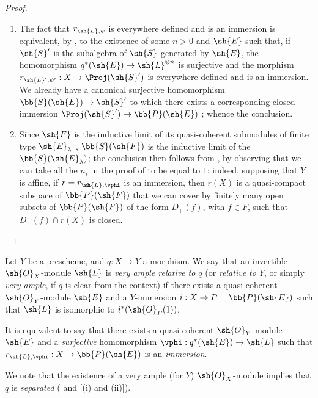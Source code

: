 \begin{proof}
\medskip\noindent
\begin{enumerate}
  \item[\rm{(i)}] The fact that $r_{\sh{L},\psi}$ is everywhere defined and is an immersion is equivalent, by , to the existence of some $n>0$ and $\sh{E}$ such that, if $\sh{S}'$ is the subalgebra of $\sh{S}$ generated by $\sh{E}$, the homomorphism $q^*(\sh{E})\to\sh{L}^{\otimes n}$ is surjective and the morphism $r_{\sh{L}',\psi'}:X\to\Proj(\sh{S}')$ is everywhere defined and is an immersion.
    We already have a canonical surjective homomorphism $\bb{S}(\sh{E})\to\sh{S}'$ to which there exists a corresponding closed immersion $\Proj(\sh{S}')\to\bb{P}(\sh{E})$ ;
    whence the conclusion.
  \item[\rm{(ii)}] Since $\sh{F}$ is the inductive limit of its quasi-coherent submodules of finite type $\sh{E}_\lambda$ , $\bb{S}(\sh{F})$ is the inductive limit of the $\bb{S}(\sh{E}_\lambda)$;
    the conclusion then follows from , by observing that we can take all the $n_i$ in the proof of  to be equal to $1$:
    indeed, supposing that $Y$ is affine, if $r=r_{\sh{L},\vphi}$ is an immersion, then $r(X)$ is a quasi-compact subspace of $\bb{P}(\sh{F})$ that we can cover by finitely many open subsets of $\bb{P}(\sh{F})$ of the form $D_+(f)$, with $f\in F$, such that $D_+(f)\cap r(X)$ is closed.
\end{enumerate}
\end{proof}

\begin{definition}[4.4.2]
\label{II.4.4.2}
Let $Y$ be a prescheme, and $q:X\to Y$ a morphism.
We say that an invertible $\sh{O}_X$-module $\sh{L}$ is \emph{very ample relative to $q$} (or \emph{relative to $Y$}, or simply \emph{very ample}, if $q$ is clear from the context) if there exists a quasi-coherent $\sh{O}_Y$-module $\sh{E}$ and a $Y$-immersion $i:X\to P=\bb{P}(\sh{E})$ such that $\sh{L}$ is isomorphic to $i^*(\sh{O}_P(1))$.
\end{definition}

It is equivalent  to say that there exists a quasi-coherent $\sh{O}_Y$-module $\sh{E}$ and a \emph{surjective} homomorphism $\vphi:q^*(\sh{E})\to\sh{L}$ such that $r_{\sh{L},\vphi}:X\to\bb{P}(\sh{E})$ is an \emph{immersion}.

We note that the existence of a very ample (for $Y$) $\sh{O}_X$-module implies that $q$ is \emph{separated} ( and [(i) and (ii)]).

